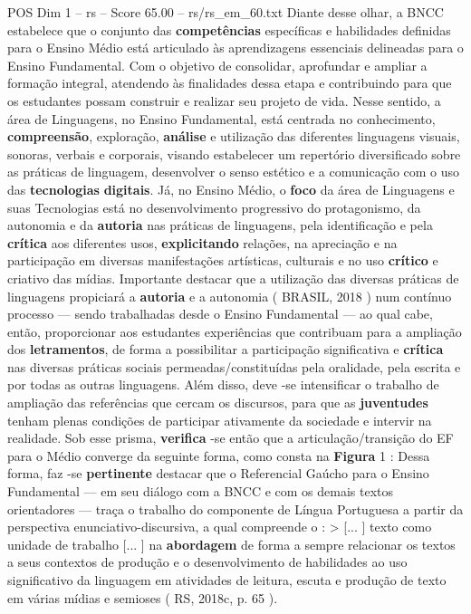 \begin{textsample}{POS Dim 1 – rs – Score 65.00 – rs/rs\_em\_60.txt}
Diante desse olhar, a BNCC estabelece que o conjunto das \textbf{competências} específicas e habilidades definidas para o Ensino Médio está articulado às aprendizagens essenciais delineadas para o Ensino Fundamental.
Com o objetivo de consolidar, aprofundar e ampliar a formação integral, atendendo às finalidades dessa etapa e contribuindo para que os estudantes possam construir e realizar seu projeto de vida.
Nesse sentido, a área de Linguagens, no Ensino Fundamental, está centrada no conhecimento, \textbf{compreensão}, exploração, \textbf{análise} e utilização das diferentes linguagens visuais, sonoras, verbais e corporais, visando estabelecer um repertório diversificado sobre as práticas de linguagem, desenvolver o senso estético e a comunicação com o uso das \textbf{tecnologias} \textbf{digitais}.
Já, no Ensino Médio, o \textbf{foco} da área de Linguagens e suas Tecnologias está no desenvolvimento progressivo do protagonismo, da autonomia e da \textbf{autoria} nas práticas de linguagens, pela identificação e pela \textbf{crítica} aos diferentes usos, \textbf{explicitando} relações, na apreciação e na participação em diversas manifestações artísticas, culturais e no uso \textbf{crítico} e criativo das mídias.
Importante destacar que a utilização das diversas práticas de linguagens propiciará a \textbf{autoria} e a autonomia ( BRASIL, 2018 ) num contínuo processo — sendo trabalhadas desde o Ensino Fundamental — ao qual cabe, então, proporcionar aos estudantes experiências que contribuam para a ampliação dos \textbf{letramentos}, de forma a possibilitar a participação significativa e \textbf{crítica} nas diversas práticas sociais permeadas/constituídas pela oralidade, pela escrita e por todas as outras linguagens.
Além disso, deve -se intensificar o trabalho de ampliação das referências que cercam os discursos, para que as \textbf{juventudes} tenham plenas condições de participar ativamente da sociedade e intervir na realidade.
Sob esse prisma, \textbf{verifica} -se então que a articulação/transição do EF para o Médio converge da seguinte forma, como consta na \textbf{Figura} 1 : Dessa forma, faz -se \textbf{pertinente} destacar que o Referencial Gaúcho para o Ensino Fundamental — em seu diálogo com a BNCC e com os demais textos orientadores — traça o trabalho do componente de Língua Portuguesa a partir da perspectiva enunciativo-discursiva, a qual compreende o : > [... ] texto como unidade de trabalho [... ] na \textbf{abordagem} de forma a sempre relacionar os textos a seus contextos de produção e o desenvolvimento de habilidades ao uso significativo da linguagem em atividades de leitura, escuta e produção de texto em várias mídias e semioses ( RS, 2018c, p. 65 ).

\end{textsample}
